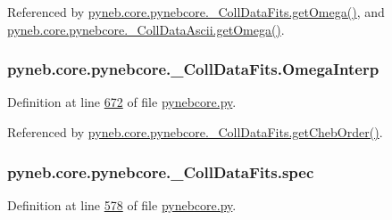 Referenced by \hyperlink{pynebcore_8py_source_l00828}{pyneb.\-core.\-pynebcore.\-\_\-\-Coll\-Data\-Fits.\-get\-Omega()}, and \hyperlink{pynebcore_8py_source_l01082}{pyneb.\-core.\-pynebcore.\-\_\-\-Coll\-Data\-Ascii.\-get\-Omega()}.

\hypertarget{classpyneb_1_1core_1_1pynebcore_1_1___coll_data_fits_a3e15df449393d23d1ac760671b5828cc}{
\subsubsection[{Omega\-Interp}]{\setlength{\rightskip}{0pt plus 5cm}pyneb.\-core.\-pynebcore.\-\_\-\-Coll\-Data\-Fits.\-Omega\-Interp}}\label{classpyneb_1_1core_1_1pynebcore_1_1___coll_data_fits_a3e15df449393d23d1ac760671b5828cc}


Definition at line \hyperlink{pynebcore_8py_source_l00672}{672} of file \hyperlink{pynebcore_8py_source}{pynebcore.\-py}.



Referenced by \hyperlink{pynebcore_8py_source_l00711}{pyneb.\-core.\-pynebcore.\-\_\-\-Coll\-Data\-Fits.\-get\-Cheb\-Order()}.

\hypertarget{classpyneb_1_1core_1_1pynebcore_1_1___coll_data_fits_a781126fa0e5b9bb0a4f6ae5afe4fd9a9}{
\subsubsection[{spec}]{\setlength{\rightskip}{0pt plus 5cm}pyneb.\-core.\-pynebcore.\-\_\-\-Coll\-Data\-Fits.\-spec}}\label{classpyneb_1_1core_1_1pynebcore_1_1___coll_data_fits_a781126fa0e5b9bb0a4f6ae5afe4fd9a9}


Definition at line \hyperlink{pynebcore_8py_source_l00578}{578} of file \hyperlink{pynebcore_8py_source}{pynebcore.\-py}.



